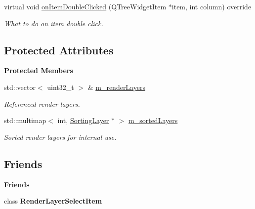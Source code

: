 \begin{Indent}
\begin{DoxyCompactItemize}
\mbox{\label{classrev_1_1_view_1_1_render_layer_select_widget_a17de24e015bbc888fa4961510efd54a8}} 
virtual void \mbox{\hyperlink{classrev_1_1_view_1_1_render_layer_select_widget_a17de24e015bbc888fa4961510efd54a8}{on\+Item\+Double\+Clicked}} (Q\+Tree\+Widget\+Item $\ast$item, int column) override
\begin{DoxyCompactList}\small\item\em What to do on item double click. \end{DoxyCompactList}\end{DoxyCompactItemize}
\end{Indent}
\subsection*{Protected Attributes}
\begin{Indent}\textbf{ Protected Members}\par
\begin{DoxyCompactItemize}
\item 
\mbox{\label{classrev_1_1_view_1_1_render_layer_select_widget_aa7c405f85ad3bfb69bbbd9096c1beb65}} 
std\+::vector$<$ uint32\+\_\+t $>$ \& \mbox{\hyperlink{classrev_1_1_view_1_1_render_layer_select_widget_aa7c405f85ad3bfb69bbbd9096c1beb65}{m\+\_\+render\+Layers}}
\begin{DoxyCompactList}\small\item\em Referenced render layers. \end{DoxyCompactList}\item 
\mbox{\label{classrev_1_1_view_1_1_render_layer_select_widget_a2491e17e92f37bb77363cb1c8784d8fb}} 
std\+::multimap$<$ int, \mbox{\hyperlink{structrev_1_1_sorting_layer}{Sorting\+Layer}} $\ast$ $>$ \mbox{\hyperlink{classrev_1_1_view_1_1_render_layer_select_widget_a2491e17e92f37bb77363cb1c8784d8fb}{m\+\_\+sorted\+Layers}}
\begin{DoxyCompactList}\small\item\em Sorted render layers for internal use. \end{DoxyCompactList}\end{DoxyCompactItemize}
\end{Indent}
\subsection*{Friends}
\begin{Indent}\textbf{ Friends}\par
\begin{DoxyCompactItemize}
\item 
\mbox{\label{classrev_1_1_view_1_1_render_layer_select_widget_a2191aa3fe19cdcd8565c2a4cdaad5d89}} 
class {\bfseries Render\+Layer\+Select\+Item}
\end{DoxyCompactItemize}
\end{Indent}
